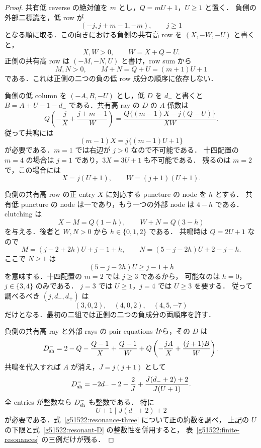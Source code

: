 \begin{proof}
共有低 reverse の絶対値を $m$ とし，$Q=mU+1$，$U\ge1$ と置く．
負側の外部二標識を，低 row が
\[
 (-j,j+m-1,-m),\qquad j\ge1
\]
となる順に取る．この向きにおける負側の共有高 row を
$(X,-W,-U)$ と書くと，
\[
 X,W>0,\qquad W=X+Q-U.
\]
正側の共有高 row は $(-M,-N,U)$ と書け，row sum から
\begin{equation}\label{g51522:MN}
 M,N>0,\qquad M+N=Q+U=(m+1)U+1
\end{equation}
である．これは正側の二つの負の低 row 成分の順序に依存しない．

負側の低 column を $(-A,B,-U)$ とし，低 $D$ を $d_-$ と書くと
$B=A+U-1-d_-$ である．共有高 ray の $D$ の $A$ 係数は
\begin{equation}\label{g51522:linear-coefficient}
 Q\left(-\frac{j}{X}+\frac{j+m-1}{W}\right)
 =\frac{Q\{(m-1)X-j(Q-U)\}}{XW}.
\end{equation}
従って共鳴には
\begin{equation}\label{g51522:resonance}
 (m-1)X=j\{(m-1)U+1\}
\end{equation}
が必要である．$m=1$ では右辺が $j>0$ なので不可能である．
十四配置の $m=4$ の場合は $j=1$ であり，$3X=3U+1$ も不可能である．
残るのは $m=2$ で，この場合には
\[
 X=j(U+1),\qquad W=(j+1)(U+1).
\]

負側の共有高 row の正 entry $X$ に対応する puncture の node を $h$ とする．
共有低 puncture の node は一であり，もう一つの外部 node は $4-h$ である．
clutching は
\[
 X-M=Q(1-h),\qquad W+N=Q(3-h)
\]
を与える．後者と $W,N>0$ から $h\in\{0,1,2\}$ である．
共鳴時は $Q=2U+1$ なので
\begin{equation}\label{g51522:resonant-MN}
 M=(j-2+2h)U+j-1+h,\qquad
 N=(5-j-2h)U+2-j-h.
\end{equation}
ここで $N\ge1$ は
\[
 (5-j-2h)U\ge j-1+h
\]
を意味する．十四配置の $m=2$ では $j\ge3$ であるから，
可能なのは $h=0$，$j\in\{3,4\}$ のみである．
$j=3$ では $U\ge1$，$j=4$ では $U\ge3$ を要する．
従って調べるべき $(j,d_-,d_+)$ は
\begin{equation}\label{g51522:resonance-three}
 (3,0,2),\quad(4,0,2),\quad(4,5,-7)
\end{equation}
だけとなる．最初の二組では正側の二つの負成分の両順序を許す．

負側の共有高 ray と外部 rays の pair equations から，その $D$ は
\[
 D_{\rm sh}^-
 =2-Q-\frac{Q-1}{X}+\frac{Q-1}{W}
       +Q\left(-\frac{jA}{X}+\frac{(j+1)B}{W}\right).
\]
共鳴を代入すれば $A$ が消え，$J=j(j+1)$ として
\begin{equation}\label{g51522:resonant-D}
 D_{\rm sh}^-
 =-2d_--2-\frac2J+
       \frac{J(d_-+2)+2}{J(U+1)}.
\end{equation}
全 entries が整数なら $D_{\rm sh}^-$ も整数である．
特に
\begin{equation}\label{g51522:finite-divisor}
 U+1\mid J(d_-+2)+2
\end{equation}
が必要である．式~\eqref{g51522:resonance-three} について正の約数を調べ，
上記の $U$ の下限と式~\eqref{g51522:resonant-D} の整数性を併用すると，
表~\ref{g51522:finite-resonances} の三例だけが残る．


\end{proof}
